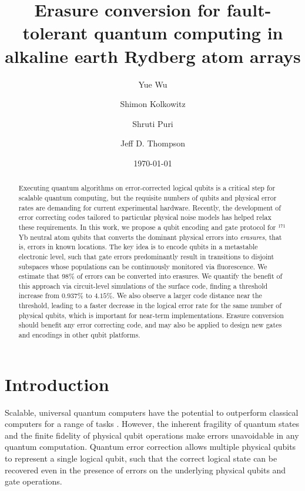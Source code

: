 \documentclass[%
reprint,
superscriptaddress,
 amsmath,amssymb,
 aps,
 prx,
floatfix,
]{revtex4-1}
\begin{document}

\title{Erasure conversion for fault-tolerant quantum computing in alkaline earth Rydberg atom arrays}

\author{Yue Wu}
\author{Shimon Kolkowitz}
\author{Shruti Puri}
\author{Jeff D. Thompson}
\date{\today}

\begin{abstract}
Executing quantum algorithms on error-corrected logical qubits is a critical step for scalable quantum computing, but the requisite numbers of qubits and physical error rates are demanding for current experimental hardware. Recently, the development of error correcting codes tailored to particular physical noise models has helped relax these requirements. In this work, we propose a qubit encoding and gate protocol for ${}^{171}$Yb neutral atom qubits that converts the dominant physical errors into \emph{erasures}, that is, errors in known locations. The key idea is to encode qubits in a metastable electronic level, such that gate errors predominantly result in transitions to disjoint subspaces whose populations can be continuously monitored via fluorescence. We estimate that 98\% of errors can be converted into erasures. We quantify the benefit of this approach via circuit-level simulations of the surface code, finding a threshold increase from $0.937\%$ to $4.15\%$. We also observe a larger code distance near the threshold, leading to a faster decrease in the logical error rate for the same number of physical qubits, which is important for near-term implementations. Erasure conversion should benefit any error correcting code, and may also be applied to design new gates and encodings in other qubit platforms.
\end{abstract}

\maketitle

\section{Introduction}
Scalable, universal quantum computers have the potential to outperform classical computers for a range of tasks \cite{montanaro2016}. However, the inherent fragility of quantum states and the finite fidelity of physical qubit operations make errors unavoidable in any quantum computation. Quantum error correction \cite{shor1995,gottesman1997,knill1997} allows multiple physical qubits to represent a single logical qubit, such that the correct logical state can be recovered even in the presence of errors on the underlying physical qubits and gate operations. %
\end{document}
